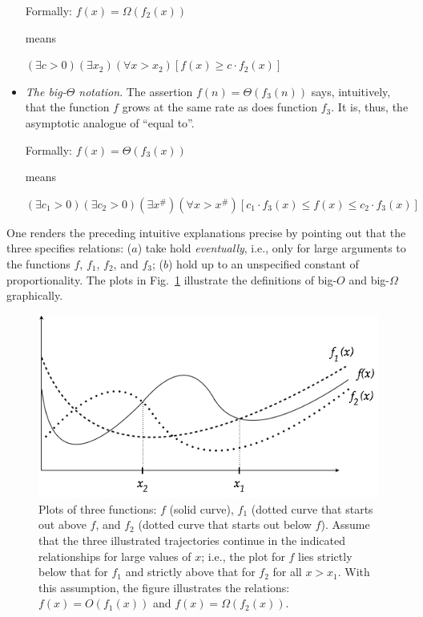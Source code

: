 \begin{itemize}
Formally:
$f(x) = \Omega(f_2(x))$

means

$(\exists c >0)(\exists x_2)(\forall x > x_2)
[f(x) \geq c \cdot  f_2(x)]$

\item
{\em The big-$\Theta$ notation}.
%
The assertion $f(n) = \Theta(f_3(n))$ says, intuitively, that the
function $f$ grows at the same rate as does function $f_3$.  It is,
thus, the asymptotic analogue of ``equal to''.

Formally:
$f(x) = \Theta(f_3(x))$

means

$(\exists c_1 >0)(\exists c_2 >0)(\exists x^{\#})(\forall x > x^{\#})
[c_1 \cdot f_3(x) \leq f(x) \leq c_2 \cdot  f_3(x)]$
\end{itemize}
One renders the preceding intuitive explanations precise by pointing
out that the three specifies relations: ($a$) take hold {\em
  eventually}, i.e., only for large arguments to the functions $f$,
$f_1$, $f_2$, and $f_3$; ($b$) hold up to an unspecified constant of
proportionality.  The plots in Fig.~\ref{fig:Asymptotic} illustrate
the definitions of big-$O$ and big-$\Omega$ graphically.
\begin{figure}[htb]
\begin{center}
       \includegraphics[scale=0.4]{FiguresArithmetic/NotationAsymptotic}
\caption{Plots of three functions: $f$ (solid curve), $f_1$ (dotted
  curve that starts out above $f$, and $f_2$ (dotted curve that starts
  out below $f$).  Assume that the three illustrated trajectories
  continue in the indicated relationships for large values of $x$;
  i.e., the plot for $f$ lies strictly below that for $f_1$ and strictly
  above that for $f_2$ for all $x > x_1$.  With this assumption, the
  figure illustrates the relations: $f(x) = O(f_1(x))$ and
  $f(x) = \Omega(f_2(x))$.
  }
\label{fig:Asymptotic}
\end{center}
\end{figure}


